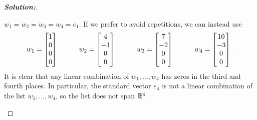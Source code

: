 \documentclass[a4paper]{amsart}
\theoremstyle{definition}
\newenvironment{solution}{\begin{proof}[\textbf{Solution:}] \vphantom{u}}{\end{proof}}
\begin{document}
\begin{solution}
\begin{itemize}
   $w_1=w_2=w_3=w_4=e_1$.  If we prefer to avoid repetitions, we can
   instead use 
   \[ w_1 = \left[\begin{matrix}  1 \\  0 \\ 0 \\ 0 \end{matrix}\right] \hspace{3em} 
      w_2 = \left[\begin{matrix}  4 \\ -1 \\ 0 \\ 0 \end{matrix}\right] \hspace{3em} 
      w_3 = \left[\begin{matrix}  7 \\ -2 \\ 0 \\ 0 \end{matrix}\right] \hspace{3em} 
      w_4 = \left[\begin{matrix} 10 \\ -3 \\ 0 \\ 0 \end{matrix}\right].
   \]
   It is clear that any linear combination of $w_1,\dotsc,w_4$ has
   zeros in the third and fourth places.  In particular, the standard
   vector $e_4$ is not a linear combination of the list
   $w_1,\dotsc,w_4$, so the list does not span ${\mathbb{R}}^4$.
 \end{itemize}
\end{solution}
\end{document}

